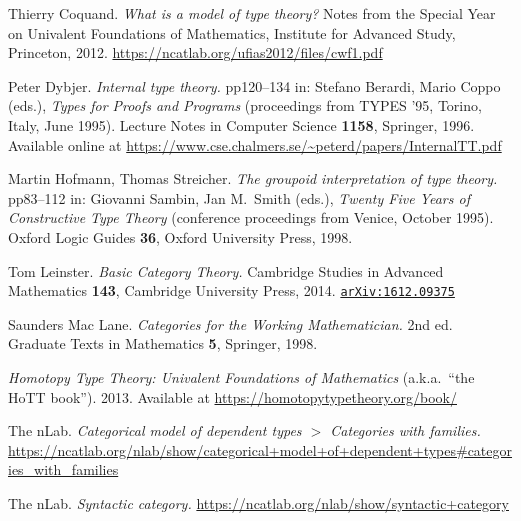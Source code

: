\documentclass{article}
\theoremstyle{definition}
\begin{document}
\begin{thebibliography}{9}

 Thierry Coquand. \textit{What is a model of type theory?} Notes from the Special Year on Univalent Foundations of Mathematics, Institute for Advanced Study, Princeton, 2012. \url{https://ncatlab.org/ufias2012/files/cwf1.pdf}

 Peter Dybjer. \textit{Internal type theory.} pp120--134 in: Stefano Berardi, Mario Coppo (eds.), \textit{Types for Proofs and Programs} (proceedings from TYPES '95, Torino, Italy, June 1995). Lecture Notes in Computer Science \textbf{1158}, Springer, 1996. Available online at \url{https://www.cse.chalmers.se/~peterd/papers/InternalTT.pdf}

 Martin Hofmann, Thomas Streicher. \textit{The groupoid interpretation of type theory.} pp83--112 in: Giovanni Sambin, Jan M.\ Smith (eds.), \textit{Twenty Five Years of Constructive Type Theory} (conference proceedings from Venice, October 1995). Oxford Logic Guides \textbf{36}, Oxford University Press, 1998.

 Tom Leinster. \textit{Basic Category Theory.} Cambridge Studies in Advanced Mathematics \textbf{143}, Cambridge University Press, 2014. \href{https://arxiv.org/abs/1612.09375}{\texttt{arXiv:1612.09375}}

 Saunders Mac Lane. \textit{Categories for the Working Mathematician.} 2nd ed. Graduate Texts in Mathematics \textbf{5}, Springer, 1998.

 \textit{Homotopy Type Theory:
Univalent Foundations of Mathematics} (a.k.a.\ ``the HoTT book''). 2013. Available at \url{https://homotopytypetheory.org/book/}

 The nLab. \textit{Categorical model of dependent types $>$ Categories with families.} \url{https://ncatlab.org/nlab/show/categorical+model+of+dependent+types#categories_with_families}

 The nLab. \textit{Syntactic category.} \url{https://ncatlab.org/nlab/show/syntactic+category}



\end{thebibliography}
\end{document}
